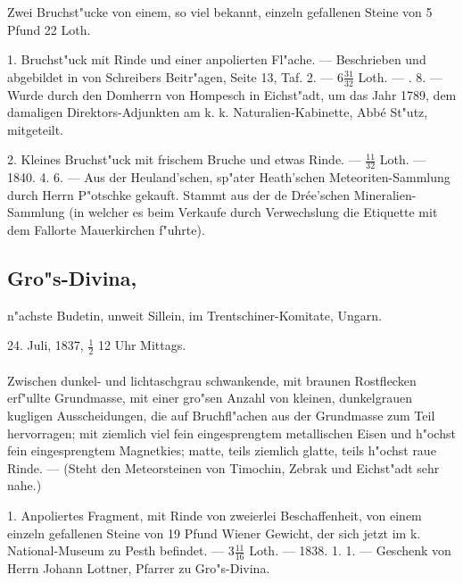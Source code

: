 \documentclass[a4paper, 11pt, oneside, polutonikogreek, german]{article}
\begin{document}
Zwei Bruchst"ucke von einem, so viel bekannt, einzeln gefallenen Steine von 5 Pfund 22 Loth.

1. Bruchst"uck mit Rinde und einer anpolierten Fl"ache. --- Beschrieben und abgebildet in von Schreibers Beitr"agen, Seite 13, Taf. 2. --- $6\frac{31}{32}$ Loth. --- . 8. --- Wurde durch den Domherrn von Hompesch in Eichst"adt, um das Jahr 1789, dem damaligen Direktors-Adjunkten am k. k. Naturalien-Kabinette, Abbé St"utz, mitgeteilt.

2. Kleines Bruchst"uck mit frischem Bruche und etwas Rinde. --- $\frac{11}{32}$ Loth. --- 1840. 4. 6. --- Aus der Heuland'schen, sp"ater Heath'schen Meteoriten-Sammlung durch Herrn P"otschke gekauft. Stammt aus der de Drée'schen Mineralien-Sammlung (in welcher es beim Verkaufe durch Verwechslung die Etiquette mit dem Fallorte Mauerkirchen f"uhrte).
\subsection[Gro"s-Divina.]{Gro"s-Divina,}
\begin{center}
\small
n"achste Budetin, unweit Sillein, im Trentschiner-Komitate, Ungarn.

24. Juli, 1837, $\frac{1}{2}$ 12 Uhr Mittags.
\end{center}
\paragraph{}
Zwischen dunkel- und lichtaschgrau schwankende, mit braunen Rostflecken erf"ullte Grundmasse, mit einer gro"sen Anzahl von kleinen, dunkelgrauen kugligen Ausscheidungen, die auf Bruchfl"achen aus der Grundmasse zum Teil hervorragen; mit ziemlich viel fein eingesprengtem metallischen Eisen und h"ochst fein eingesprengtem Magnetkies; matte, teils ziemlich glatte, teils h"ochst raue Rinde. --- (Steht den Meteorsteinen von Timochin, Zebrak und Eichst"adt sehr nahe.)

1. Anpoliertes Fragment, mit Rinde von zweierlei Beschaffenheit, von einem einzeln gefallenen Steine von 19 Pfund Wiener Gewicht, der sich jetzt im k. National-Museum zu Pesth befindet. --- $3\frac{11}{16}$ Loth. --- 1838. 1. 1. --- Geschenk von Herrn Johann Lottner, Pfarrer zu Gro"s-Divina.
\end{document}
